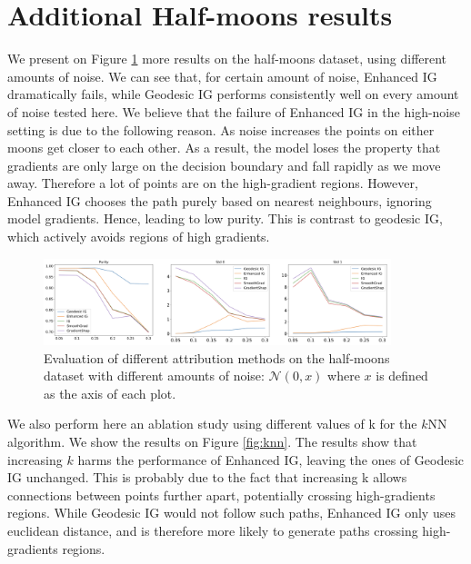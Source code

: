 \section{Additional Half-moons results}
\label{app:half-moons}

We present on Figure \ref{fig:noises} more results on the half-moons dataset, using different amounts of noise. We can see that, for certain amount of noise, Enhanced IG dramatically fails, while Geodesic IG performs consistently well on every amount of noise tested here. We believe that the failure of Enhanced IG in the high-noise setting is due to the following reason. As noise increases the points on either moons get closer to each other. As a result, the model loses the property that gradients are only large on the decision boundary and fall rapidly as we move away. Therefore a lot of points are on the high-gradient regions. However, Enhanced IG chooses the path purely based on nearest neighbours, ignoring model gradients. Hence, leading to low purity. This is contrast to geodesic IG, which actively avoids regions of high gradients.

\begin{figure}[ht]
\vskip 0.2in
\begin{center}
\centerline{\includegraphics[width=0.9\textwidth]{figures/noises.png}}
\caption{Evaluation of different attribution methods on the half-moons dataset with different amounts of noise: $\mathcal{N}(0, x)$ where $x$ is defined as the axis of each plot.}
\label{fig:noises}
\end{center}
\vskip -0.2in
\end{figure}

We also perform here an ablation study using different values of k for the $k$NN algorithm. We show the results on Figure \ref{fig:knn}. The results show that increasing $k$ harms the performance of Enhanced IG, leaving the ones of Geodesic IG unchanged. This is probably due to the fact that increasing k allows connections between points further apart, potentially crossing high-gradients regions. While Geodesic IG would not follow such paths, Enhanced IG only uses euclidean distance, and is therefore more likely to generate paths crossing high-gradients regions.

